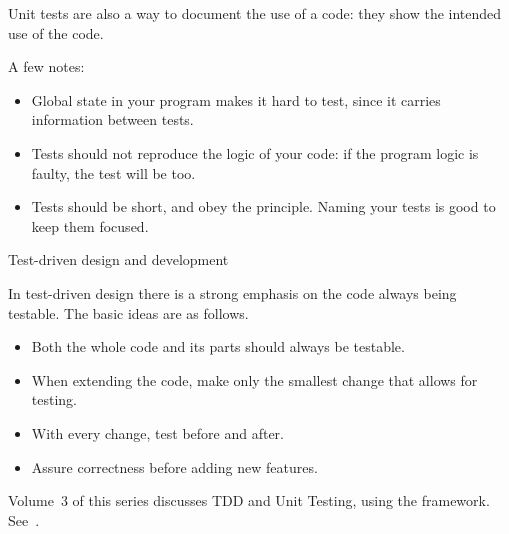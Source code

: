 Unit tests are also a way to document the use of a code:
they show the intended use of the code.

A few notes:
\begin{itemize}
\item Global state in your program makes it hard to test,
  since it carries information between tests.
\item Tests should not reproduce the logic of your code:
  if the program logic is faulty, the test will be too.
\item Tests should be short, and obey the  principle.
  Naming your tests is good to keep them focused.
\end{itemize}

 {Test-driven design and development}

In test-driven design there is a strong emphasis on the code always
being testable. The basic ideas are as follows.
\begin{itemize}
\item Both the whole code and its parts should always be testable.
\item When extending the code, make only the smallest change that
  allows for testing.
\item With every change, test before and after.
\item Assure correctness before adding new features.
\end{itemize}

Volume~3 of this series discusses \ac{TDD} and Unit Testing, using the
 framework. See~.

